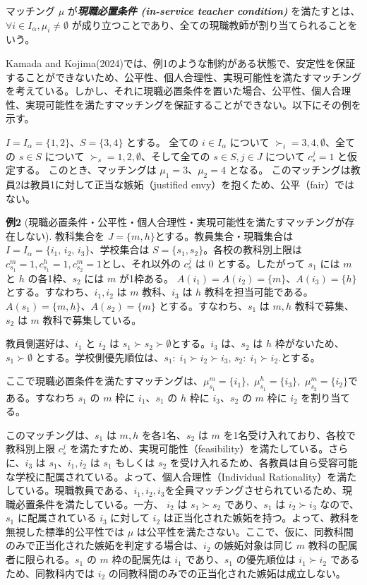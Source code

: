 \documentclass[12pt, a4paper]{article}
\theoremstyle{definition}
\theoremstyle{remark}
\theoremstyle{plain}
\begin{document}
マッチング $\mu$ が\textbf{\textit{現職必置条件 (in-service teacher condition) }}を満たすとは、$\forall i \in I_{\alpha}, \mu_i \neq \emptyset$ が成り立つことであり、全ての現職教師が割り当てられることをいう。


Kamada and Kojima(2024)では、例1のような制約がある状態で、安定性を保証することができないため、公平性、個人合理性、実現可能性を満たすマッチングを考えている。しかし、それに現職必置条件を置いた場合、公平性、個人合理性、実現可能性を満たすマッチングを保証することができない。以下にその例を示す。


$I = I_\alpha = \{1, 2\}$、$S = \{3, 4\}$ とする。
全ての $i \in I_\alpha$ について $\succ_i = 3, 4, \emptyset$、全ての $s \in S$ について $\succ_s = 1, 2, \emptyset$、そして全ての $s \in S, j \in J$ について $c_s^j = 1$ と仮定する。
このとき、マッチングは $\mu_1 = 3$、$\mu_2 = 4$ となる。
このマッチングは教員2は教員1に対して正当な嫉妬（justified envy）を抱くため、公平（fair）ではない。



\textbf{例2} (現職必置条件・公平性・個人合理性・実現可能性を満たすマッチングが存在しない). 
教科集合を $J=\{m,h\}$とする。教員集合・現職集合は $I=I_\alpha=\{i_1,\,i_2,\,i_3\}$、学校集合は $S=\{s_1,s_2\}$。各校の教科別上限は$c_{s_1}^m=1, c_{s_1}^h=1, c_{s_2}^m=1$とし、それ以外の $c_s^j$ は $0$ とする。したがって $s_1$ には $m$ と $h$ の各1枠、$s_2$ には $m$ が1枠ある。
$A(i_1)=A(i_2)=\{m\}$、$A(i_3)=\{h\}$ とする。すなわち、$i_1,i_2$ は $m$ 教科、$i_3$ は $h$ 教科を担当可能である。
$A(s_1)=\{m,h\}$、$A(s_2)=\{m\}$ とする。すなわち、$s_1$ は $m,h$ 教科で募集、$s_2$ は $m$ 教科で募集している。

教員側選好は、$i_1$ と $i_2$ は $s_1 \succ s_2 \succ \emptyset$とする。$i_3$ は、$s_2$ は $h$ 枠がないため、$s_1 \succ \emptyset$ とする。学校側優先順位は、$s_1:\; i_1 \succ i_2 \succ i_3$, $s_2:\; i_1 \succ i_2.$とする。

ここで現職必置条件を満たすマッチングは、$\mu_{s_1}^m = \{i_1\},$ $\mu_{s_1}^h = \{i_3\},$ $\mu_{s_2}^m = \{i_2\}$である。すなわち $s_1$ の $m$ 枠に $i_1$、$s_1$ の $h$ 枠に $i_3$、$s_2$ の $m$ 枠に $i_2$ を割り当てる。

このマッチングは、$s_1$ は $m,h$ を各1名、$s_2$ は $m$ を1名受け入れており、各校で教科別上限 $c_s^j$ を満たすため、実現可能性（feasibility）を満たしている。さらに、$i_3$ は $s_1$、$i_1,i_2$ は $s_1$ もしくは $s_2$ を受け入れるため、各教員は自ら受容可能な学校に配属されている。よって、個人合理性（Individual Rationality）を満たしている。現職教員である、$i_1,i_2,i_3$を全員マッチングさせられているため、現職必置条件を満たしている。一方、 $i_2$ は $s_1 \succ s_2$ であり、$s_1$ は $i_2 \succ i_3$ なので、$s_1$ に配属されている $i_3$ に対して $i_2$ は正当化された嫉妬を持つ。よって、教科を無視した標準的公平性では $\mu$ は公平性を満たさない。ここで、仮に、同教科間のみで正当化された嫉妬を判定する場合は、$i_2$ の嫉妬対象は同じ $m$ 教科の配属者に限られる。$s_1$ の $m$ 枠の配属先は $i_1$ であり、$s_1$ の優先順位は $i_1 \succ i_2$ であるため、同教科内では $i_2$ の同教科間のみでの正当化された嫉妬は成立しない。
\end{document}
